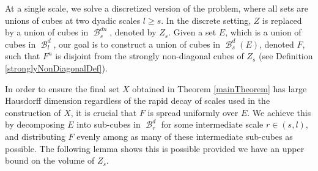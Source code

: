 \documentclass[dvipsnames,letterpaper,12pt]{article}
\numberwithin{equation}{section}
\theoremstyle{plain}
\DeclareMathOperator{\B}{\mathcal{B}}
\begin{document}
At a single scale, we solve a discretized version of the problem, where all sets are unions of cubes at two dyadic scales $l \geq s$. In the discrete setting, $Z$ is replaced by a union of cubes in $\B^{dn}_s$, denoted by $Z_s$. Given a set $E$, which is a union of cubes in $\B_l^d$, our goal is to construct a union of cubes in $\B_s^d(E)$, denoted $F$, such that $F^n$ is disjoint from the strongly non-diagonal cubes of $Z_s$ (see Definition \ref{stronglyNonDiagonalDef}).

In order to ensure the final set $X$ obtained in Theorem \ref{mainTheorem} has large Hausdorff dimension regardless of the rapid decay of scales used in the construction of $X$, it is crucial that $F$ is spread uniformly over $E$. We achieve this by decomposing $E$ into sub-cubes in $\B_r^d$ for some intermediate scale $r \in (s,l)$, and distributing $F$ evenly among as many of these intermediate sub-cubes as possible. The following lemma shows this is possible provided we have an upper bound on the volume of $Z_s$.

\end{document}
